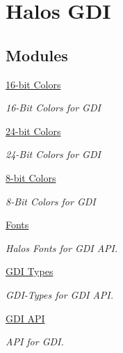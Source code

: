 \hypertarget{group___g_d_i}{
\section{Halos GDI}
\label{group___g_d_i}
}
\subsection*{Modules}
\begin{CompactItemize}
\item 
\hyperlink{group__hgdi__colors16}{16-bit Colors}
\begin{CompactList}\small\item\em 16-Bit Colors for GDI \item\end{CompactList}

\item 
\hyperlink{group__hgdi__colors24}{24-bit Colors}
\begin{CompactList}\small\item\em 24-Bit Colors for GDI \item\end{CompactList}

\item 
\hyperlink{group__hgdi__colors8}{8-bit Colors}
\begin{CompactList}\small\item\em 8-Bit Colors for GDI \item\end{CompactList}

\item 
\hyperlink{group__hgdi__fonts}{Fonts}
\begin{CompactList}\small\item\em Halos Fonts for GDI API. \item\end{CompactList}

\item 
\hyperlink{group__hgdi__types}{GDI Types}
\begin{CompactList}\small\item\em GDI-Types for GDI API. \item\end{CompactList}

\item 
\hyperlink{group__hgdi__api}{GDI API}
\begin{CompactList}\small\item\em API for GDI. \item\end{CompactList}

\end{CompactItemize}
